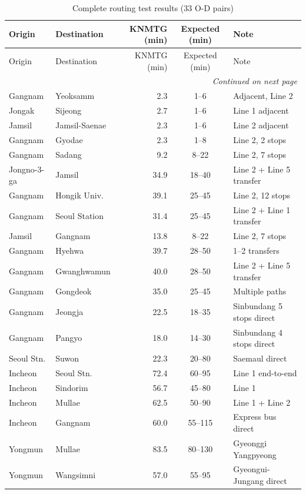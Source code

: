 \documentclass[12pt]{article}
\begin{document}
\begin{longtable}{llrcp{4cm}}
\caption{Complete routing test results (33 O-D pairs)} \label{tab:tests} \\
\toprule
Origin & Destination & KNMTG (min) & Expected (min) & Note \\
\midrule
\endfirsthead
\toprule
Origin & Destination & KNMTG (min) & Expected (min) & Note \\
\midrule
\endhead
\midrule \multicolumn{5}{r}{\textit{Continued on next page}} \\
\endfoot
\bottomrule
\endlastfoot
Gangnam & Yeoksamm & 2.3 & 1--6 & Adjacent, Line 2 \\
Jongak & Sijeong & 2.7 & 1--6 & Line 1 adjacent \\
Jamsil & Jamsil-Saenae & 2.3 & 1--6 & Line 2 adjacent \\
Gangnam & Gyodae & 2.3 & 1--8 & Line 2, 2 stops \\
Gangnam & Sadang & 9.2 & 8--22 & Line 2, 7 stops \\
Jongno-3-ga & Jamsil & 34.9 & 18--40 & Line 2 + Line 5 transfer \\
Gangnam & Hongik Univ. & 39.1 & 25--45 & Line 2, 12 stops \\
Gangnam & Seoul Station & 31.4 & 25--45 & Line 2 + Line 1 transfer \\
Jamsil & Gangnam & 13.8 & 8--22 & Line 2, 7 stops \\
Gangnam & Hyehwa & 39.7 & 28--50 & 1--2 transfers \\
Gangnam & Gwanghwamun & 40.0 & 28--50 & Line 2 + Line 5 transfer \\
Gangnam & Gongdeok & 35.0 & 25--45 & Multiple paths \\
Gangnam & Jeongja & 22.5 & 18--35 & Sinbundang 5 stops direct \\
Gangnam & Pangyo & 18.0 & 14--30 & Sinbundang 4 stops direct \\
Seoul Stn. & Suwon & 22.3 & 20--80 & Saemaul direct \\
Incheon & Seoul Stn. & 72.4 & 60--95 & Line 1 end-to-end \\
Incheon & Sindorim & 56.7 & 45--80 & Line 1 \\
Incheon & Mullae & 62.5 & 50--90 & Line 1 + Line 2 \\
Incheon & Gangnam & 60.0 & 55--115 & Express bus direct \\
Yongmun & Mullae & 83.5 & 80--130 & Gyeonggi Yangpyeong \\
Yongmun & Wangsimni & 57.0 & 55--95 & Gyeongui-Jungang direct \\

\end{longtable}
\end{document}
